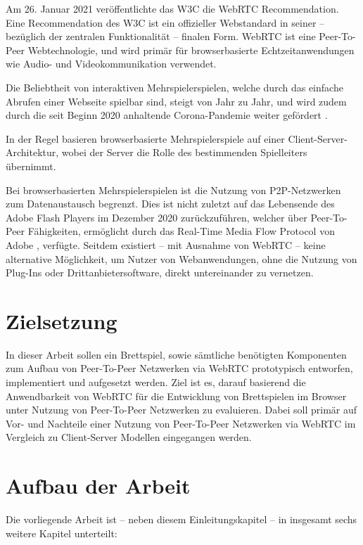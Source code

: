 Am 26. Januar 2021 veröffentlichte das \ac{W3C} die \ac{WebRTC} Recommendation. Eine Recommendation des \acs{W3C} ist ein offizieller Webstandard in seiner -- bezüglich der zentralen Funktionalität -- finalen Form. \acs{WebRTC} ist eine Peer-To-Peer Webtechnologie, und wird primär für browserbasierte Echtzeitanwendungen wie Audio- und Videokommunikation verwendet.\par

Die Beliebtheit von interaktiven Mehrspielerspielen, welche durch das einfache Abrufen einer Webseite spielbar sind, steigt von Jahr zu Jahr, und wird zudem durch die seit Beginn 2020 anhaltende Corona-Pandemie weiter gefördert \cite{BGMarket}.\par

In der Regel basieren browserbasierte Mehrspielerspiele auf einer Client-Server-Architektur, wobei der Server die Rolle des bestimmenden Spielleiters übernimmt.\par

Bei browserbasierten Mehrspielerspielen ist die Nutzung von \acf{P2P}-Netzwerken zum Datenaustausch  begrenzt. Dies ist nicht zuletzt auf das Lebensende des Adobe Flash Players im Dezember 2020 zurückzuführen, welcher über Peer-To-Peer Fähigkeiten, ermöglicht durch das Real-Time Media Flow Protocol von Adobe \cite{adobeRFC}, verfügte. Seitdem existiert -- mit Ausnahme von \acs{WebRTC} -- keine alternative Möglichkeit, um Nutzer von Webanwendungen, ohne die Nutzung von Plug-Ins oder Drittanbietersoftware, direkt untereinander zu vernetzen.\par

\section{Zielsetzung}
In dieser Arbeit sollen ein Brettspiel, sowie sämtliche benötigten Komponenten zum Aufbau von Peer-To-Peer Netzwerken via \acs{WebRTC} prototypisch entworfen, implementiert und aufgesetzt werden. Ziel ist es, darauf basierend die Anwendbarkeit von \acs{WebRTC} für die Entwicklung von Brettspielen im Browser unter Nutzung von Peer-To-Peer Netzwerken zu evaluieren. Dabei soll primär auf Vor- und Nachteile einer Nutzung von Peer-To-Peer Netzwerken via \acs{WebRTC} im Vergleich zu Client-Server Modellen eingegangen werden.

\section{Aufbau der Arbeit}
Die vorliegende Arbeit ist -- neben diesem Einleitungskapitel -- in insgesamt sechs weitere Kapitel unterteilt:

